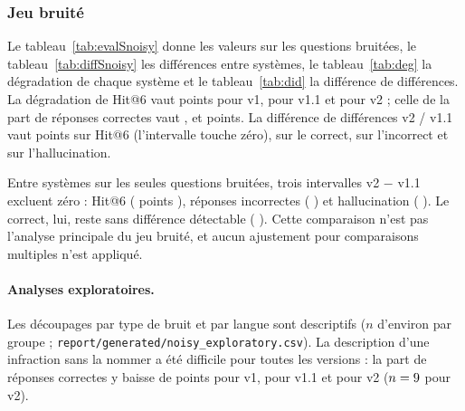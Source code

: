 
\subsubsection{Jeu bruité}
Le tableau~\ref{tab:evalSnoisy} donne les valeurs sur les questions bruitées, le tableau~\ref{tab:diffSnoisy} les différences
entre systèmes, le tableau~\ref{tab:deg} la dégradation de chaque système et le tableau~\ref{tab:did} la différence de
différences. La dégradation de Hit@6 vaut \EvDegVoneHit{} points pour v1, \EvDegVoneoneHit{} pour v1.1 et \EvDegVtwoHit{} pour v2 ;
celle de la part de réponses correctes vaut \EvDegVoneCorrect, \EvDegVoneoneCorrect{} et \EvDegVtwoCorrect{} points.
La différence de différences v2 / v1.1 vaut \EvDidVtwoVoneoneHit{} points \EvDidVtwoVoneoneHitCI{} sur Hit@6 (l'intervalle touche
zéro), \EvDidVtwoVoneoneCorrect{} \EvDidVtwoVoneoneCorrectCI{} sur le correct, \EvDidVtwoVoneoneIncorrect{}
\EvDidVtwoVoneoneIncorrectCI{} sur l'incorrect et \EvDidVtwoVoneoneHalluc{} \EvDidVtwoVoneoneHallucCI{} sur l'hallucination.

Entre systèmes sur les seules questions bruitées, trois intervalles v2 $-$ v1.1 excluent zéro : Hit@6
(\EvDiffSnoisyVtwoVoneoneHit{} points \EvDiffSnoisyVtwoVoneoneHitCI), réponses incorrectes (\EvDiffSnoisyVtwoVoneoneIncorrect{}
\EvDiffSnoisyVtwoVoneoneIncorrectCI) et hallucination (\EvDiffSnoisyVtwoVoneoneHalluc{} \EvDiffSnoisyVtwoVoneoneHallucCI). Le
correct, lui, reste sans différence détectable (\EvDiffSnoisyVtwoVoneoneCorrect{} \EvDiffSnoisyVtwoVoneoneCorrectCI). Cette
comparaison n'est pas l'analyse principale du jeu bruité, et aucun ajustement pour comparaisons multiples n'est appliqué.

\paragraph{Analyses exploratoires.} Les découpages par type de bruit et par langue sont descriptifs ($n$ d'environ
\EvGroupTyposN{} par groupe ; \texttt{report/generated/noisy\_exploratory.csv}). La description d'une infraction sans la nommer a été
difficile pour toutes les versions : la part de réponses correctes y baisse de \EvDegDescribeVoneCorrect{} points pour v1,
\EvDegDescribeVoneoneCorrect{} pour v1.1 et \EvDegDescribeVtwoCorrect{} pour v2 ($n=9$ pour v2).

